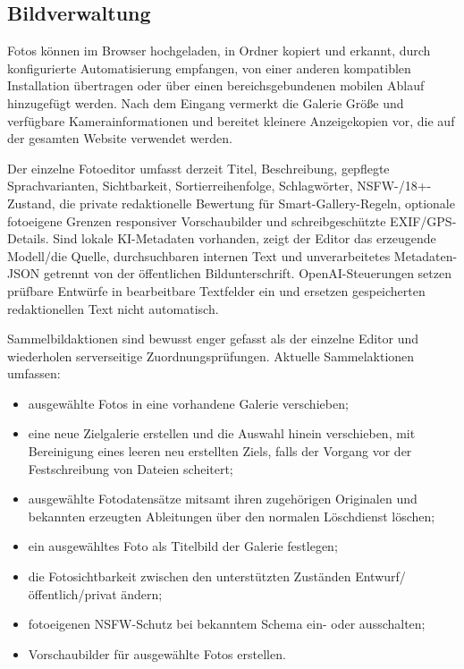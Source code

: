 \documentclass[11pt,a4paper]{article}
\begin{document}
\subsection{Bildverwaltung}
\label{sec:media}

Fotos können im Browser hochgeladen, in Ordner kopiert und erkannt, durch
konfigurierte Automatisierung empfangen, von einer anderen kompatiblen
Installation übertragen oder über einen bereichsgebundenen mobilen Ablauf
hinzugefügt werden. Nach dem Eingang vermerkt die Galerie Größe und verfügbare
Kamerainformationen und bereitet kleinere Anzeigekopien vor, die auf der
gesamten Website verwendet werden.

Der einzelne Fotoeditor umfasst derzeit Titel, Beschreibung, gepflegte
Sprachvarianten, Sichtbarkeit, Sortierreihenfolge, Schlagwörter,
NSFW-/18+-Zustand, die private redaktionelle Bewertung für Smart-Gallery-Regeln,
optionale fotoeigene Grenzen responsiver Vorschaubilder und schreibgeschützte
EXIF/GPS-Details. Sind lokale KI-Metadaten vorhanden, zeigt der Editor das
erzeugende Modell/die Quelle, durchsuchbaren internen Text und unverarbeitetes
Metadaten-JSON getrennt von der öffentlichen Bildunterschrift.
OpenAI-Steuerungen setzen prüfbare Entwürfe in bearbeitbare Textfelder ein und
ersetzen gespeicherten redaktionellen Text nicht automatisch.

Sammelbildaktionen sind bewusst enger gefasst als der einzelne Editor und
wiederholen serverseitige Zuordnungsprüfungen. Aktuelle Sammelaktionen umfassen:

\begin{itemize}
  \item ausgewählte Fotos in eine vorhandene Galerie verschieben;
  \item eine neue Zielgalerie erstellen und die Auswahl hinein verschieben, mit
  Bereinigung eines leeren neu erstellten Ziels, falls der Vorgang vor der
  Festschreibung von Dateien scheitert;
  \item ausgewählte Fotodatensätze mitsamt ihren zugehörigen Originalen und
  bekannten erzeugten Ableitungen über den normalen Löschdienst löschen;
  \item ein ausgewähltes Foto als Titelbild der Galerie festlegen;
  \item die Fotosichtbarkeit zwischen den unterstützten Zuständen
  Entwurf/öffentlich/privat ändern;
  \item fotoeigenen NSFW-Schutz bei bekanntem Schema ein- oder ausschalten;
  \item Vorschaubilder für ausgewählte Fotos erstellen.
\end{itemize}
\end{document}
